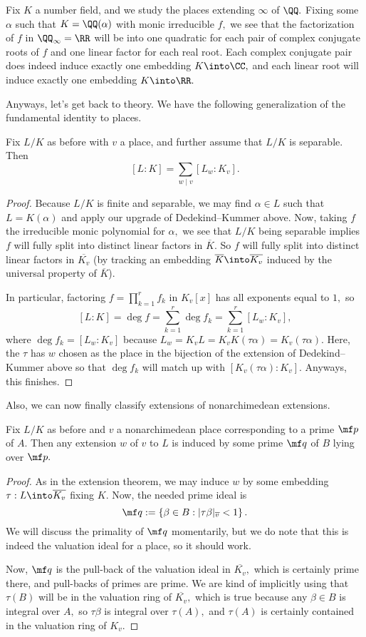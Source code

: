 \begin{example}
	Fix $K$ a number field, and we study the places extending $\infty$ of $\QQ.$ Fixing some $\alpha$ such that $K=\QQ(\alpha)$ with monic irreducible $f,$ we see that the factorization of $f$ in $\QQ_\infty=\RR$ will be into one quadratic for each pair of complex conjugate roots of $f$ and one linear factor for each real root. Each complex conjugate pair does indeed induce exactly one embedding $K\into\CC,$ and each linear root will induce exactly one embedding $K\into\RR.$
\end{example}
Anyways, let's get back to theory. We have the following generalization of the fundamental identity to places.
\begin{proposition}
	Fix $L/K$ as before with $v$ a place, and further assume that $L/K$ is separable. Then
	\[[L:K]=\sum_{w\mid v}[L_w:K_v].\]
\end{proposition}
\begin{proof}
	Because $L/K$ is finite and separable, we may find $\alpha\in L$ such that $L=K(\alpha)$ and apply our upgrade of Dedekind--Kummer above. Now, taking $f$ the irreducible monic polynomial for $\alpha,$ we see that $L/K$ being separable implies $f$ will fully split into distinct linear factors in $\overline K.$ So $f$ will fully split into distinct linear factors in $\overline{K_v}$ (by tracking an embedding $\overline K\into\overline{K_v}$ induced by the universal property of $\overline K$).

	In particular, factoring $f=\prod_{k=1}^rf_k$ in $K_v[x]$ has all exponents equal to $1,$ so
	\[[L:K]=\deg f=\sum_{k=1}^r\deg f_k=\sum_{k=1}^r[L_w:K_v],\]
	where $\deg f_k=[L_w:K_v]$ because $L_w=K_vL=K_vK(\tau\alpha)=K_v(\tau\alpha).$ Here, the $\tau$ has $w$ chosen as the place in the bijection of the extension of Dedekind--Kummer above so that $\deg f_k$ will match up with $[K_v(\tau\alpha):K_v].$ Anyways, this finishes.
\end{proof}
Also, we can now finally classify extensions of nonarchimedean extensions.
\begin{proposition}
	Fix $L/K$ as before and $v$ a nonarchimedean place corresponding to a prime $\mf p$ of $A.$ Then any extension $w$ of $v$ to $L$ is induced by some prime $\mf q$ of $B$ lying over $\mf p.$
\end{proposition}
\begin{proof}
	As in the extension theorem, we may induce $w$ by some embedding $\tau:L\into\overline{K_v}$ fixing $K.$ Now, the needed prime ideal is
	\[\mf q:=\left\{\beta\in B:|\tau\beta|_{\overline v}<1\right\}.\]
	We will discuss the primality of $\mf q$ momentarily, but we do note that this is indeed the valuation ideal for a place, so it should work.

	Now, $\mf q$ is the pull-back of the valuation ideal in $\overline{K_v},$ which is certainly prime there, and pull-backs of primes are prime. We are kind of implicitly using that $\tau(B)$ will be in the valuation ring of $\overline{K_v},$ which is true because any $\beta\in B$ is integral over $A,$ so $\tau\beta$ is integral over $\tau(A),$ and $\tau(A)$ is certainly contained in the valuation ring of $K_v.$
\end{proof}